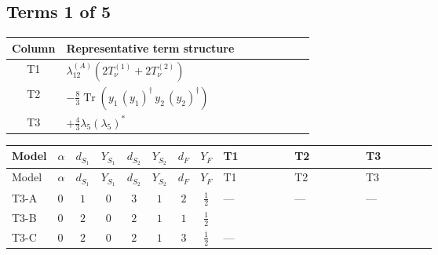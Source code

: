 \documentclass[8pt]{article}
\begin{document}
\begin{landscape}
\subsection*{Terms 1 of 5}
\begin{center}
\begin{tabular}{@{}c >{\raggedright\arraybackslash}p{0.82\linewidth}@{}}
\toprule
Column & Representative term structure \\
\midrule
T1 & \(\displaystyle {\lambda_{12}^{(A)}} (2 T_{\nu}^{(1)}+2 T_{\nu}^{(2)})\) \\
\midrule
T2 & \(\displaystyle -\frac{8}{3} \operatorname{Tr}\!\left({y_1}\,\left({y_1}\right)^{\dagger}\,{y_2}\,\left({y_2}\right)^{\dagger}\right)\) \\
\midrule
T3 & \(\displaystyle +\frac{4}{3} {\lambda_5} \left({\lambda_5}\right)^{*}\) \\
\midrule
\bottomrule
\end{tabular}
\end{center}
\smallskip
\tiny
\begin{longtable}{@{}llcccccc >{\raggedright\arraybackslash}p{0.21\linewidth} >{\raggedright\arraybackslash}p{0.21\linewidth} >{\raggedright\arraybackslash}p{0.21\linewidth}@{}}
\toprule
Model & $\alpha$ & $d_{S_1}$ & $Y_{S_1}$ & $d_{S_2}$ & $Y_{S_2}$ & $d_F$ & $Y_F$ & T1 & T2 & T3 \\
\midrule
\endfirsthead
\toprule
Model & $\alpha$ & $d_{S_1}$ & $Y_{S_1}$ & $d_{S_2}$ & $Y_{S_2}$ & $d_F$ & $Y_F$ & T1 & T2 & T3 \\
\midrule
\endhead
T3-A & $0$ & $1$ & $0$ & $3$ & $1$ & $2$ & $\frac{1}{2}$ & --- & --- & --- \\
\midrule
T3-B & $0$ & $2$ & $0$ & $2$ & $1$ & $1$ & $\frac{1}{2}$ & \scriptsize\adjustbox{max width=\linewidth}{$\begin{gathered} {\lambda_{12}^{(A)}} (2 T_{\nu}^{(1)}+2 T_{\nu}^{(2)})\end{gathered}$} & \scriptsize\adjustbox{max width=\linewidth}{$\begin{gathered} -\frac{8}{3} \operatorname{Tr}\!\left({y_1}\,\left({y_1}\right)^{\dagger}\,{y_2}\,\left({y_2}\right)^{\dagger}\right)\end{gathered}$} & \scriptsize\adjustbox{max width=\linewidth}{$\begin{gathered} +\frac{4}{3} {\lambda_5} \left({\lambda_5}\right)^{*}\end{gathered}$} \\
\midrule
T3-C & $0$ & $2$ & $0$ & $2$ & $1$ & $3$ & $\frac{1}{2}$ & --- & \scriptsize\adjustbox{max width=\linewidth}{$\begin{gathered} -\frac{2}{3} \operatorname{Tr}\!\left({y_1}\,\left({y_1}\right)^{\dagger}\,{y_2}\,\left({y_2}\right)^{\dagger}\right)\end{gathered}$} & \scriptsize\adjustbox{max width=\linewidth}{$\begin{gathered} +\frac{4}{3} {\lambda_5} \left({\lambda_5}\right)^{*}\end{gathered}$} \\

\end{longtable}
\end{landscape}
\end{document}
